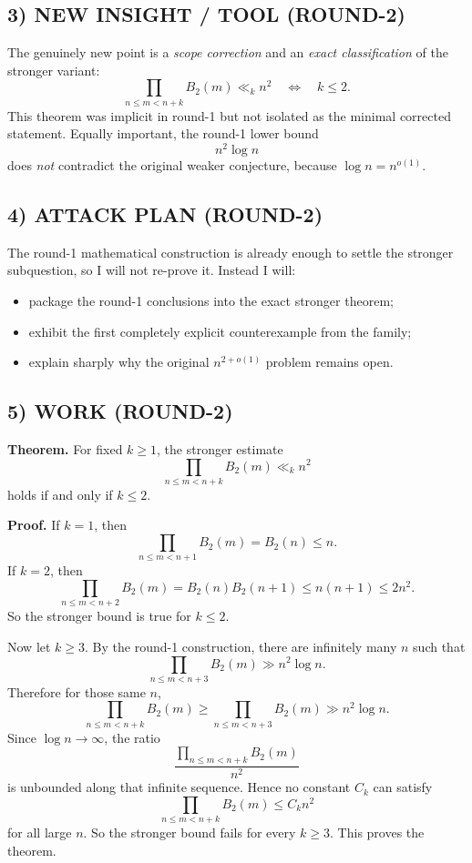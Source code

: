 \subsection*{3) NEW INSIGHT / TOOL (ROUND-2)}
The genuinely new point is a \emph{scope correction} and an \emph{exact classification} of the stronger variant:
\[
\prod_{n\le m<n+k} B_2(m) \ll_k n^2
\quad\Longleftrightarrow\quad
k\le 2.
\]
This theorem was implicit in round-1 but not isolated as the minimal corrected statement. Equally important, the round-1 lower bound
\[
n^2\log n
\]
does \emph{not} contradict the original weaker conjecture, because $\log n=n^{o(1)}$.

\subsection*{4) ATTACK PLAN (ROUND-2)}
The round-1 mathematical construction is already enough to settle the stronger subquestion, so I will not re-prove it. Instead I will:
\begin{itemize}
\item package the round-1 conclusions into the exact stronger theorem;
\item exhibit the first completely explicit counterexample from the family;
\item explain sharply why the original $n^{2+o(1)}$ problem remains open.
\end{itemize}

\subsection*{5) WORK (ROUND-2)}
\textbf{Theorem.} For fixed $k\ge 1$, the stronger estimate
\[
\prod_{n\le m<n+k} B_2(m) \ll_k n^2
\]
holds if and only if $k\le 2$.

\medskip
\textbf{Proof.}
If $k=1$, then
\[
\prod_{n\le m<n+1} B_2(m)=B_2(n)\le n.
\]
If $k=2$, then
\[
\prod_{n\le m<n+2} B_2(m)=B_2(n)B_2(n+1)\le n(n+1)\le 2n^2.
\]
So the stronger bound is true for $k\le 2$.

Now let $k\ge 3$. By the round-1 construction, there are infinitely many $n$ such that
\[
\prod_{n\le m<n+3} B_2(m) \gg n^2\log n.
\]
Therefore for those same $n$,
\[
\prod_{n\le m<n+k} B_2(m)
\ge
\prod_{n\le m<n+3} B_2(m)
\gg n^2\log n.
\]
Since $\log n\to\infty$, the ratio
\[
\frac{\prod_{n\le m<n+k} B_2(m)}{n^2}
\]
is unbounded along that infinite sequence. Hence no constant $C_k$ can satisfy
\[
\prod_{n\le m<n+k} B_2(m)\le C_k n^2
\]
for all large $n$. So the stronger bound fails for every $k\ge 3$.
This proves the theorem.

